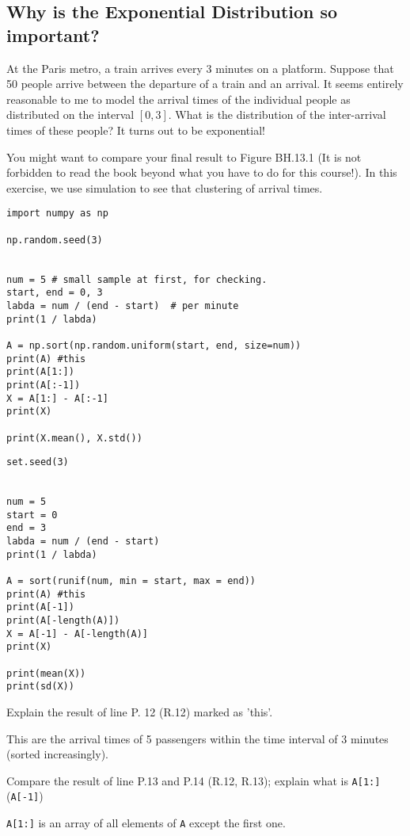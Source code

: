 

\subsection{Why is the Exponential Distribution so important?}

At the Paris metro, a train arrives every 3 minutes on a platform.
Suppose that 50 people arrive between the departure of a train and an arrival.
It seems entirely reasonable to me to model the arrival times of the individual people as distributed on the interval \([0,3]\).
What is the distribution of the inter-arrival times of these people?
It turns out to be exponential!

You might want to compare your final result to Figure BH.13.1 (It is not forbidden to read the book beyond what you have to do for this course!).
In this exercise, we use simulation to see that clustering of arrival times.


\begin{verbatim}
import numpy as np

np.random.seed(3)


num = 5 # small sample at first, for checking.
start, end = 0, 3
labda = num / (end - start)  # per minute
print(1 / labda)

A = np.sort(np.random.uniform(start, end, size=num))
print(A) #this
print(A[1:])
print(A[:-1])
X = A[1:] - A[:-1]
print(X)

print(X.mean(), X.std())
\end{verbatim}


\begin{verbatim}
set.seed(3)


num = 5
start = 0
end = 3
labda = num / (end - start)
print(1 / labda)

A = sort(runif(num, min = start, max = end))
print(A) #this
print(A[-1])
print(A[-length(A)])
X = A[-1] - A[-length(A)]
print(X)

print(mean(X))
print(sd(X))
\end{verbatim}

\begin{exercise}
Explain the result of line P. 12 (R.12) marked as 'this'.
\begin{solution}
This are the arrival times of 5 passengers within the time interval of 3 minutes (sorted increasingly).
\end{solution}
\end{exercise}

\begin{exercise}
Compare the result of  line P.13 and P.14 (R.12, R.13);  explain what is \texttt{A[1:]} (\texttt{A[-1]})
\begin{solution}
\verb|A[1:]| is an array of all elements of \verb|A| except the first one.
\end{solution}
\end{exercise}

